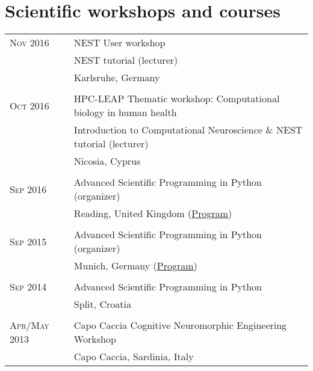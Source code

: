 \documentclass[a4paper,10pt]{article}
\begin{document}
\section{Scientific workshops and courses}
\begin{tabular}{>{\hfill}p{3.15cm}|p{10.4cm}}
  \textsc{Nov} 2016 & NEST User workshop \\
                    & \footnotesize NEST tutorial (lecturer) \\
                    & \footnotesize Karlsruhe, Germany \\
  \multicolumn{2}{c}{} \\
  \textsc{Oct} 2016 & HPC-LEAP Thematic workshop: Computational biology in human health \\
                    & \footnotesize Introduction to Computational Neuroscience \& NEST tutorial (lecturer) \\
                    & \footnotesize Nicosia, Cyprus \\
  \multicolumn{2}{c}{} \\
  \textsc{Sep} 2016 & Advanced Scientific Programming in Python (organizer)\\
                    &  \footnotesize Reading, United Kingdom (\href{https://python.g-node.org/python-summerschool-2016/schedule.html}{Program}) \\
  \multicolumn{2}{c}{} \\
  \textsc{Sep} 2015 & Advanced Scientific Programming in Python (organizer)\\
  &  \footnotesize Munich, Germany (\href{https://python.g-node.org/python-summerschool-2015/schedule.html}{Program})\\
  \multicolumn{2}{c}{} \\
  \textsc{Sep} 2014 & Advanced Scientific Programming in Python \\
  &  \footnotesize Split, Croatia \\
  \multicolumn{2}{c}{} \\
  \textsc{Apr}/\textsc{May} 2013 & Capo Caccia Cognitive Neuromorphic Engineering Workshop \\
  & \footnotesize Capo Caccia, Sardinia, Italy
\end{tabular}
\end{document}
